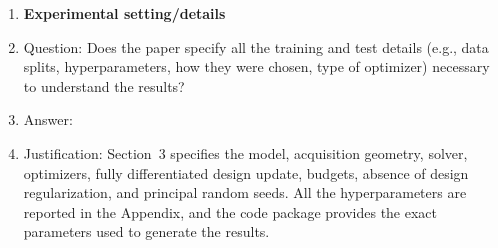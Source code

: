 \begin{enumerate}
\item {\bf Experimental setting/details}
    \item[] Question: Does the paper specify all the training and test details (e.g., data splits, hyperparameters, how they were chosen, type of optimizer) necessary to understand the results?
    \item[] Answer: \answerYes{}
    \item[] Justification: Section~3 specifies the model, acquisition geometry,
    solver, optimizers, fully differentiated design update, budgets, absence of
    design regularization, and principal random seeds. All the hyperparameters are reported in the Appendix, and the code package provides the exact parameters used to generate the results.


\end{enumerate}
